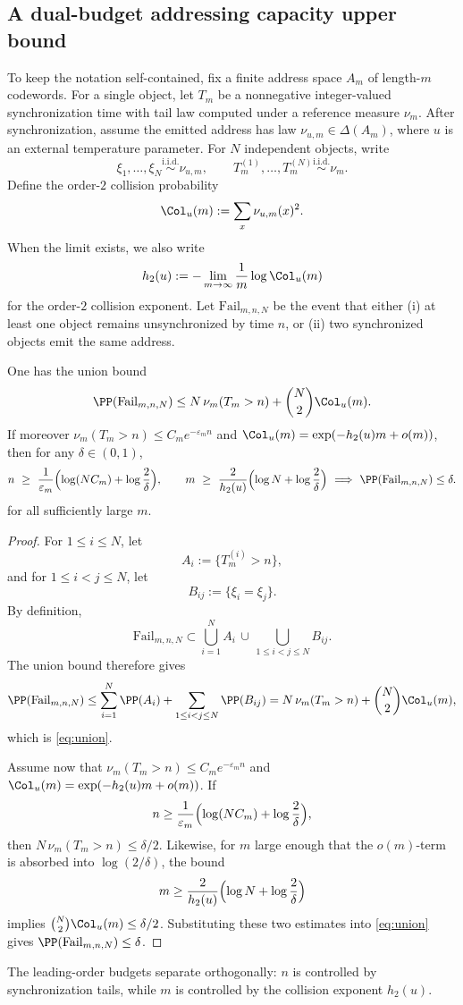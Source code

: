 \subsection{A dual-budget addressing capacity upper bound}
To keep the notation self-contained, fix a finite address space \(A_m\) of length-\(m\) codewords. For a single object, let \(T_m\) be a nonnegative integer-valued synchronization time with tail law computed under a reference measure \(\nu_m\). After synchronization, assume the emitted address has law \(\nu_{u,m}\in\Delta(A_m)\), where \(u\) is an external temperature parameter. For \(N\) independent objects, write
\[
\xi_1,\dots,\xi_N\stackrel{\mathrm{i.i.d.}}{\sim}\nu_{u,m},
\qquad
T_m^{(1)},\dots,T_m^{(N)}\stackrel{\mathrm{i.i.d.}}{\sim}\nu_m.
\]
Define the order-\(2\) collision probability
\[
\Col_u(m):=\sum_x \nu_{u,m}(x)^2.
\]
When the limit exists, we also write
\[
h_2(u):=
-\lim_{m\to\infty}\frac{1}{m}\log \Col_u(m)
\]
for the order-\(2\) collision exponent. Let \(\mathrm{Fail}_{m,n,N}\) be the event that either (i) at least one object remains unsynchronized by time \(n\), or (ii) two synchronized objects emit the same address.

\begin{theorem}\label{thm:budget}
One has the union bound
\begin{equation}\label{eq:union}
\PP(\mathrm{Fail}_{m,n,N})
\le
N\,\nu_m(T_m>n)+\binom{N}{2}\Col_u(m).
\end{equation}
If moreover \(\nu_m(T_m>n)\le C_m e^{-\varepsilon_m n}\) and \(\Col_u(m)=\exp(-h_2(u)m+o(m))\), then for any \(\delta\in(0,1)\),
\[
n\ \ge\ \frac{1}{\varepsilon_m}\Bigl(\log(NC_m)+\log\frac{2}{\delta}\Bigr),
\qquad
m\ \ge\ \frac{2}{h_2(u)}\Bigl(\log N+\log\frac{2}{\delta}\Bigr)
\ \Longrightarrow\ 
\PP(\mathrm{Fail}_{m,n,N})\le\delta.
\]
for all sufficiently large \(m\).
\end{theorem}

\begin{proof}
For \(1\le i\le N\), let
\[
A_i:=\{T_m^{(i)}>n\},
\]
and for \(1\le i<j\le N\), let
\[
B_{ij}:=\{\xi_i=\xi_j\}.
\]
By definition,
\[
\mathrm{Fail}_{m,n,N}\subset \bigcup_{i=1}^N A_i \,\cup\, \bigcup_{1\le i<j\le N} B_{ij}.
\]
The union bound therefore gives
\[
\PP(\mathrm{Fail}_{m,n,N})
\le
\sum_{i=1}^N\PP(A_i)+\sum_{1\le i<j\le N}\PP(B_{ij})
=
N\,\nu_m(T_m>n)+\binom{N}{2}\Col_u(m),
\]
which is \eqref{eq:union}.

Assume now that \(\nu_m(T_m>n)\le C_m e^{-\varepsilon_m n}\) and \(\Col_u(m)=\exp(-h_2(u)m+o(m))\). If
\[
n\ge \frac{1}{\varepsilon_m}\Bigl(\log(NC_m)+\log\frac{2}{\delta}\Bigr),
\]
then \(N\,\nu_m(T_m>n)\le \delta/2\). Likewise, for \(m\) large enough that the \(o(m)\)-term is absorbed into \(\log(2/\delta)\), the bound
\[
m\ge \frac{2}{h_2(u)}\Bigl(\log N+\log\frac{2}{\delta}\Bigr)
\]
implies \(\binom{N}{2}\Col_u(m)\le \delta/2\). Substituting these two estimates into \eqref{eq:union} gives \(\PP(\mathrm{Fail}_{m,n,N})\le \delta\).
\end{proof}

\begin{remark}
The leading-order budgets separate orthogonally: \(n\) is controlled by synchronization tails, while \(m\) is controlled by the collision exponent \(h_2(u)\).
\end{remark}

